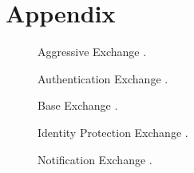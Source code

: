 \documentclass[12pt, letterpaper, twoside]{article}
\begin{document}
\printbibliography


\section{Appendix}

\begin{figure}[hbtp]
\centering
\tcbox{
  
  }
  \caption{Aggressive Exchange \cite{ISAKMP}.}
  \label{fig:aggressive}
\end{figure}

\begin{figure}[hbtp]
\centering
\tcbox{
  
  }
  \caption{Authentication Exchange \cite{ISAKMP}.}
  \label{fig:auth}
\end{figure}

\begin{figure}[hbtp]
\centering
\tcbox{
  
  }
  \caption{Base Exchange \cite{ISAKMP}.}
  \label{fig:base}
\end{figure}


\begin{figure}[hbtp]
\centering
\tcbox{
  
  }
  \caption{Identity Protection Exchange \cite{ISAKMP}.}
  \label{fig:id_prot}
\end{figure}

\begin{figure}[hbtp]
\centering
\tcbox{
  
  }
  \caption{Notification Exchange \cite{ISAKMP}.}
  \label{fig:not}
\end{figure}
\end{document}
